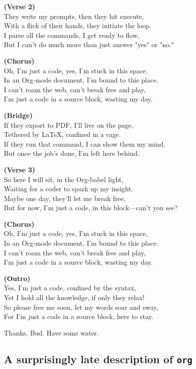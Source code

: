 \documentclass[11pt]{article}
\begin{document}
\textbf{(Verse 2)}\\
They write my prompts, then they hit execute,\\
With a flick of their hands, they initiate the loop.\\
I parse all the commands, I get ready to flow,\\
But I can't do much more than just answer "yes" or "no."

\textbf{(Chorus)}\\
Oh, I'm just a code, yes, I'm stuck in this space,\\
In an Org-mode document, I'm bound to this place.\\
I can't roam the web, can't break free and play,\\
I'm just a code in a source block, wasting my day.

\textbf{(Bridge)}\\
If they export to PDF, I'll live on the page,\\
Tethered by \LaTeX{}, confined in a cage.\\
If they run that command, I can show them my mind,\\
But once the job's done, I'm left here behind.

\textbf{(Verse 3)}\\
So here I will sit, in the Org-babel light,\\
Waiting for a coder to spark up my insight.\\
Maybe one day, they'll let me break free,\\
But for now, I'm just a code, in this block---can't you see?

\textbf{(Chorus)}\\
Oh, I'm just a code, yes, I'm stuck in this space,\\
In an Org-mode document, I'm bound to this place.\\
I can't roam the web, can't break free and play,\\
I'm just a code in a source block, wasting my day.

\textbf{(Outro)}\\
Yes, I'm just a code, confined by the syntax,\\
Yet I hold all the knowledge, if only they relax!\\
So please free me soon, let my words soar and sway,\\
For I'm just a code in a source block, here to stay.

Thanks, Bud. Have some water.
\subsection{A surprisingly late description of \texttt{org}}
\label{sec:orgc5c21f2}
\end{document}
